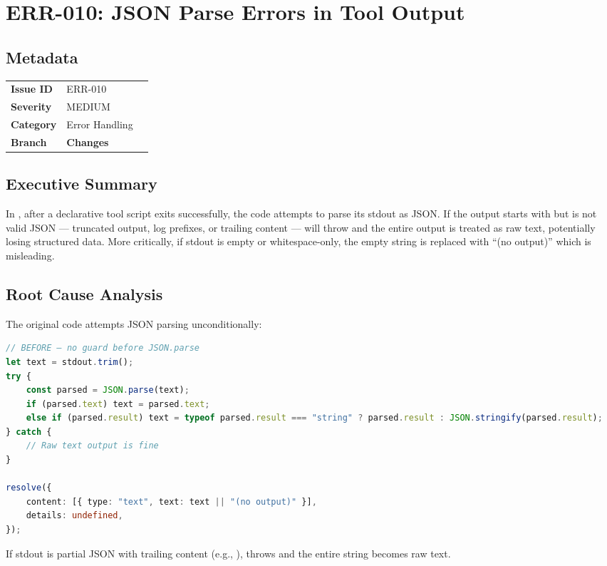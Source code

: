 \section{ERR-010: JSON Parse Errors in Tool Output}
\label{sec:err-010}
\subsection*{Metadata}
\begin{tabular}{ll}
\textbf{Issue ID} & ERR-010 \\
\textbf{Severity} & MEDIUM \\
\textbf{Category} & Error Handling \\
\textbf{Branch} & 
\textbf{Changes} &  \\
\end{tabular}

\subsection*{Executive Summary}
In , after a declarative tool script exits successfully, the code attempts to parse its stdout as JSON. If the output starts with \code{\{} but is not valid JSON — truncated output, log prefixes, or trailing content —  will throw and the entire output is treated as raw text, potentially losing structured data. More critically, if stdout is empty or whitespace-only, the empty string is replaced with ``(no output)'' which is misleading.

\subsection*{Root Cause Analysis}
The original code attempts JSON parsing unconditionally:

\begin{lstlisting}[language=TypeScript]
// BEFORE — no guard before JSON.parse
let text = stdout.trim();
try {
    const parsed = JSON.parse(text);
    if (parsed.text) text = parsed.text;
    else if (parsed.result) text = typeof parsed.result === "string" ? parsed.result : JSON.stringify(parsed.result);
} catch {
    // Raw text output is fine
}

resolve({
    content: [{ type: "text", text: text || "(no output)" }],
    details: undefined,
});
\end{lstlisting}

If stdout is partial JSON with trailing content (e.g., ),  throws and the entire string becomes raw text.


